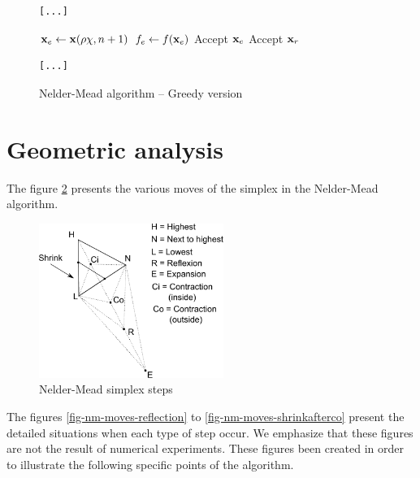 \begin{figure}[htbp]
\begin{verbatim}
[...]
\end{verbatim}
\begin{algorithmic}
    \STATE $\mathbf{x}_e \gets \mathbf{x}(\rho\chi,n+1)$ 
    \STATE $f_e \gets f(\mathbf{x}_e)$ 
      \STATE Accept $\mathbf{x}_e$
    \ELSE
      \STATE Accept $\mathbf{x}_r$
    \ENDIF
\end{algorithmic}
\begin{verbatim}
[...]
\end{verbatim}
\caption{Nelder-Mead algorithm -- Greedy version}
\label{algo-neldermead-greedy}
\end{figure}


\section{Geometric analysis}

The figure \ref{fig-nm-moves} presents the various moves of the 
simplex in the Nelder-Mead algorithm.

\begin{figure}
\begin{center}
\includegraphics[width=6cm]{neldermeadmethod/nelder-mead-steps.pdf}
\end{center}
\caption{Nelder-Mead simplex steps}
\label{fig-nm-moves}
\end{figure}

The figures \ref{fig-nm-moves-reflection} 
to \ref{fig-nm-moves-shrinkafterco} present the 
detailed situations when each type of step occur.
We emphasize that these figures are not the result of 
numerical experiments. These figures been created in order 
to illustrate the following specific points of the algorithm.

